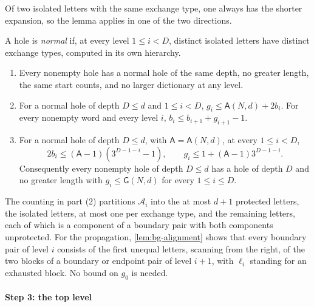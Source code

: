 Of two isolated letters with the same exchange type, one always has the
shorter expansion, so the lemma applies in one of the two directions.

A hole is \emph{normal} if, at every level $1\le i<D$, distinct isolated
letters have distinct exchange types, computed in its own hierarchy.

\begin{lemma}\label{lem:bg-dictionary}
\leavevmode
\begin{enumerate}[leftmargin=*]
\item Every nonempty hole has a normal hole of the same depth, no greater
  length, the same start counts, and no larger dictionary at any level.
\item For a normal hole of depth $D\le d$ and $1\le i<D$,
  $g_i\le\mathsf A(N,d)+2b_i$. For every nonempty word and every level $i$,
  $b_i\le b_{i+1}+g_{i+1}-1$.
\item For a normal hole of depth $D\le d$, with $\mathsf A=\mathsf A(N,d)$, at
  every $1\le i<D$,
  \[
   2b_i\le(\mathsf A-1)(3^{D-1-i}-1),\qquad g_i\le1+(\mathsf A-1)3^{D-1-i}.
  \]
  Consequently every nonempty hole of depth $D\le d$ has a hole of depth $D$ and
  no greater length with $g_i\le\mathsf G(N,d)$ for every $1\le i\le D$.
\end{enumerate}
\end{lemma}

The counting in part (2) partitions $\mathcal A_i$ into the at most $d+1$
protected letters, the isolated letters, at most one per exchange type, and the
remaining letters, each of which is a component of a boundary pair with both
components unprotected. For the propagation, \cref{lem:bg-alignment} shows
that every boundary pair of level $i$ consists of the first unequal letters,
scanning from the right, of the two blocks of a boundary or endpoint pair of
level $i+1$, with $\ell_i$ standing for an exhausted block. No bound on $g_0$
is needed.

\paragraph{Step 3: the top level}

